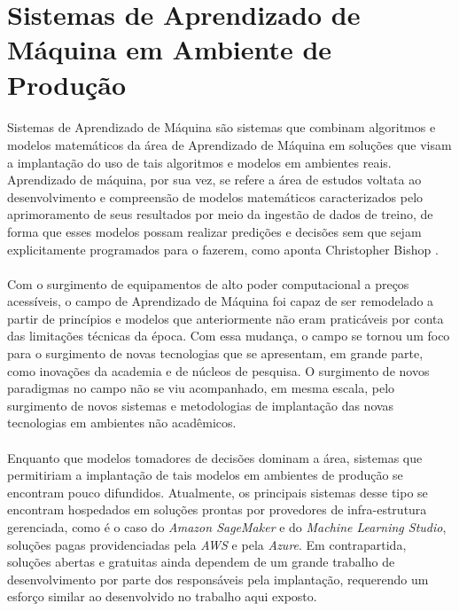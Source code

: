\section{Sistemas de Aprendizado de Máquina em Ambiente de Produção}

\paragraph{}Sistemas de Aprendizado de Máquina são sistemas que combinam algoritmos e modelos matemáticos da área de Aprendizado de Máquina em soluções que visam a implantação do uso de tais algoritmos e modelos em ambientes reais. Aprendizado de máquina, por sua vez, se refere a área de estudos voltata ao desenvolvimento e compreensão de modelos matemáticos caracterizados pelo aprimoramento de seus resultados por meio da ingestão de dados de treino, de forma que esses modelos possam realizar predições e decisões sem que sejam explicitamente programados para o fazerem, como aponta Christopher Bishop \cite{Bishop}.

\paragraph{}Com o surgimento de equipamentos de alto poder computacional a preços acessíveis, o campo de Aprendizado de Máquina foi capaz de ser remodelado a partir de princípios e modelos que anteriormente não eram praticáveis por conta das limitações técnicas da época. Com essa mudança, o campo se tornou um foco para o surgimento de novas tecnologias que se apresentam, em grande parte, como inovações da academia e de núcleos de pesquisa. O surgimento de novos paradigmas no campo não se viu acompanhado, em mesma escala, pelo surgimento de novos sistemas e metodologias de implantação das novas tecnologias em ambientes não acadêmicos.

\paragraph{}Enquanto que modelos tomadores de decisões dominam a área, sistemas que permitiriam a implantação de tais modelos em ambientes de produção se encontram pouco difundidos. Atualmente, os principais sistemas desse tipo se encontram hospedados em soluções prontas por provedores de infra-estrutura gerenciada, como é o caso do \textit{Amazon SageMaker} e do \textit{Machine Learning Studio}, soluções pagas providenciadas pela \textit{AWS} e pela \textit{Azure}. Em contrapartida, soluções abertas e gratuitas ainda dependem de um grande trabalho de desenvolvimento por parte dos responsáveis pela implantação, requerendo um esforço similar ao desenvolvido no trabalho aqui exposto.

